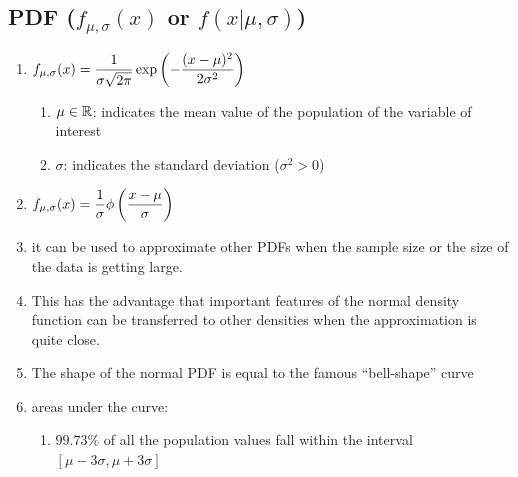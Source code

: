 \subsection{PDF ($f_{\mu, \sigma}(x)$ or $f(x|\mu, \sigma)$)}

\begin{enumerate}
    \item[]  $
        f_{\mu, \sigma}(x)
        = \dfrac{1}{\sigma\sqrt{2\pi}} \exp\left(-\dfrac{(x-\mu)^2}{2\sigma^2}\right)
    $ 
    \hfill \cite{statistics/book/Statistics-for-Data-Scientists/Maurits-Kaptein}
    \begin{enumerate}
        \item[] $\mu \in \mathbb{R}$: indicates the mean value of the population of the variable of interest
        \hfill \cite{statistics/book/Statistics-for-Data-Scientists/Maurits-Kaptein}

        \item[] $\sigma$: indicates the standard deviation ($\sigma^2 > 0$)
        \hfill \cite{statistics/book/Statistics-for-Data-Scientists/Maurits-Kaptein}
    \end{enumerate}

    \item[] $f_{\mu, \sigma}(x) = \dfrac{1}{\sigma}\phi\left(\dfrac{x-\mu}{\sigma}\right)$
    \hfill \cite{statistics/book/Statistics-for-Data-Scientists/Maurits-Kaptein}

    \item it can be used to approximate other PDFs when the sample size or the size of the data is getting large.
    \hfill \cite{statistics/book/Statistics-for-Data-Scientists/Maurits-Kaptein}

    \item This has the advantage that important features of the normal density function can be transferred to other densities when the approximation is quite close. 
    \hfill \cite{statistics/book/Statistics-for-Data-Scientists/Maurits-Kaptein}

    \item The shape of the normal PDF is equal to the famous “bell-shape” curve 
    \hfill \cite{statistics/book/Statistics-for-Data-Scientists/Maurits-Kaptein}

    \item areas under the curve:
    \begin{enumerate}
        \item $99.73\%$ of all the population values fall within the interval $[\mu - 3\sigma, \mu + 3\sigma]$
        \hfill \cite{statistics/book/Statistics-for-Data-Scientists/Maurits-Kaptein}
    

\end{enumerate}
\end{enumerate}
